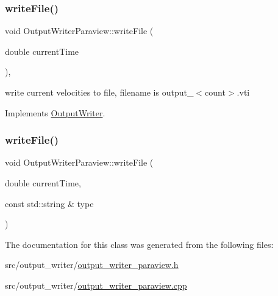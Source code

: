 \subsubsection{\texorpdfstring{writeFile()}{writeFile()}\hspace{0.1cm}{\footnotesize\ttfamily [1/2]}}
{\footnotesize\ttfamily void Output\+Writer\+Paraview\+::write\+File (\begin{DoxyParamCaption}\item[{double}]{current\+Time }\end{DoxyParamCaption})\hspace{0.3cm}{\ttfamily [inline]}, {\ttfamily [virtual]}}



write current velocities to file, filename is output\+\_\+$<$count$>$.\+vti 



Implements \mbox{\hyperlink{classOutputWriter_ac625c204affdc05919388a3549c2e945}{Output\+Writer}}.

\mbox{\label{classOutputWriterParaview_a7435aa313465ac178a5c55d68a2534b5}} 
\subsubsection{\texorpdfstring{writeFile()}{writeFile()}\hspace{0.1cm}{\footnotesize\ttfamily [2/2]}}
{\footnotesize\ttfamily void Output\+Writer\+Paraview\+::write\+File (\begin{DoxyParamCaption}\item[{double}]{current\+Time,  }\item[{const std\+::string \&}]{type }\end{DoxyParamCaption})}



The documentation for this class was generated from the following files\+:\begin{DoxyCompactItemize}
\item 
src/output\+\_\+writer/\mbox{\hyperlink{output__writer__paraview_8h}{output\+\_\+writer\+\_\+paraview.\+h}}\item 
src/output\+\_\+writer/\mbox{\hyperlink{output__writer__paraview_8cpp}{output\+\_\+writer\+\_\+paraview.\+cpp}}\end{DoxyCompactItemize}
